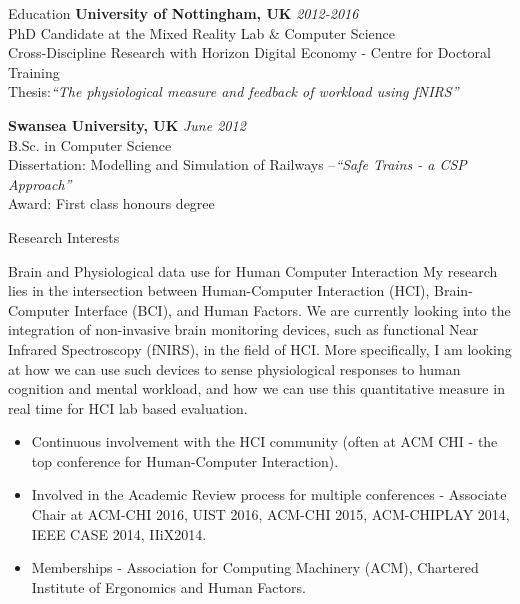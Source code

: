 \documentclass{resume} %
\begin{document}

\begin{rSection}{Education}
{\bf University of Nottingham, UK} \hfill {\em 2012-2016} \\
PhD Candidate at the Mixed Reality Lab \& Computer Science \\
Cross-Discipline Research with Horizon Digital Economy - Centre for Doctoral Training \\
Thesis:\emph{``The physiological measure and feedback of workload using fNIRS''} \smallskip \\
\vspace{-1 mm}

{\bf Swansea University, UK} \hfill {\em June 2012} \\
B.Sc. in Computer Science \\
Dissertation: Modelling and Simulation of Railways –\emph{``Safe Trains - a CSP Approach''}\smallskip \\
Award: First class honours degree

\end{rSection}

\begin{rSection}{Research Interests}
\begin{rSubsection}{Brain and Physiological data use for Human Computer Interaction}{ }{ }{ }
\vspace{-5 mm}
My research lies in the intersection between Human-Computer Interaction (HCI), Brain-Computer
Interface (BCI), and Human Factors. We are currently looking into the integration of non-invasive
brain monitoring devices, such as functional Near Infrared Spectroscopy (fNIRS), in the field of HCI.
More specifically, I am looking at how we can use such devices to sense physiological responses to
human cognition and mental workload, and how we can use this quantitative measure in real time for HCI lab based evaluation.

\begin{itemize}
  \item Continuous involvement with the HCI community (often at ACM CHI - the top conference for Human-Computer Interaction).
  \item Involved in the Academic Review process for multiple conferences - Associate Chair at ACM-CHI 2016, UIST 2016, ACM-CHI 2015, ACM-CHIPLAY 2014, IEEE CASE 2014, IIiX2014.
  \item  Memberships - Association for Computing Machinery (ACM), Chartered Institute of Ergonomics and Human Factors.
\end{itemize}

\end{rSubsection}

\end{rSection}
\end{document}
